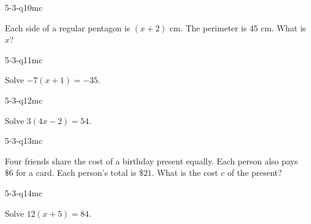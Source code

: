 \begin{practiceQuestion}{5-3-q10}{mc}
\begin{questionText}
Each side of a regular pentagon is $(x + 2)$ cm. The perimeter is $45$ cm. What is $x$?
\end{questionText}
\end{practiceQuestion}

\begin{practiceQuestion}{5-3-q11}{mc}
\begin{questionText}
Solve $-7(x + 1) = -35$.
\end{questionText}
\end{practiceQuestion}

\begin{practiceQuestion}{5-3-q12}{mc}
\begin{questionText}
Solve $3(4x - 2) = 54$.
\end{questionText}
\end{practiceQuestion}

\begin{practiceQuestion}{5-3-q13}{mc}
\begin{questionText}
Four friends share the cost of a birthday present equally. Each person also pays $\$6$ for a card. Each person's total is $\$21$. What is the cost $c$ of the present?
\end{questionText}
\end{practiceQuestion}

\begin{practiceQuestion}{5-3-q14}{mc}
\begin{questionText}
Solve $12(x + 5) = 84$.
\end{questionText}
\end{practiceQuestion}

